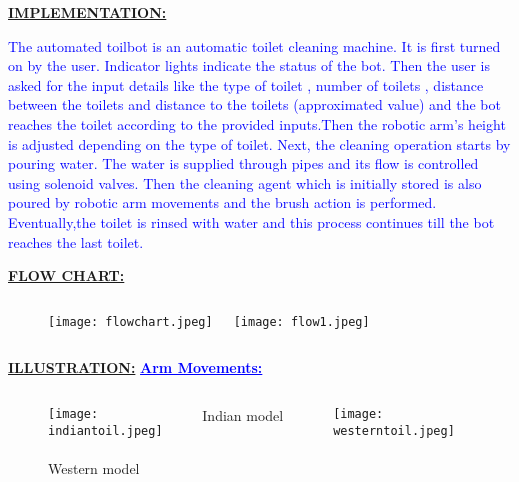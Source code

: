 \documentclass{beamer}
\begin{document}
\begin{frame}
{\underline{\textbf{IMPLEMENTATION:}}}

\textcolor{blue}{The automated toilbot is an automatic toilet cleaning machine.
It is first turned on by the user. Indicator lights indicate the status of the bot. Then the user is asked for the input details like the type of toilet , number of toilets , distance between the toilets and distance to the toilets (approximated value) and the bot reaches the toilet according to the provided inputs.Then the robotic arm’s height is  adjusted depending on the type of toilet. Next, the cleaning operation starts by pouring water. The water is supplied through pipes and its flow is controlled using solenoid valves. Then the cleaning agent which is initially stored is also poured by robotic arm movements and the brush action is performed. Eventually,the toilet is rinsed with water and this process continues till the bot reaches the last toilet.}


\end{frame}


\begin{frame}
{\underline{\textbf{FLOW CHART:}}}

\begin{figure}\begin{columns}

\texttt{[image: flowchart.jpeg]}


\texttt{[image: flow1.jpeg]}
\end{columns}
\end{figure}


\end{frame}

\begin{frame}
{\underline{\textbf{ILLUSTRATION:}}}
\textbf{\textcolor{blue}{\underline{Arm Movements:}}}
\begin{figure}\begin{columns}

\texttt{[image: indiantoil.jpeg]}
\caption{Indian model  \   \   \    \    \   \   \    \    }


\texttt{[image: westerntoil.jpeg]}
\caption{Western model  \   \   \    \    \   \   \    \    }
\end{columns}
\end{figure}

\end{frame}
\end{document}

